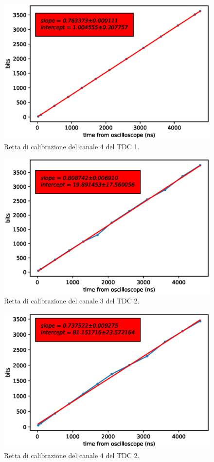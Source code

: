 \begin{figure}[H]
  \centering
  \includegraphics[width=.8\textwidth]{plots/tdc14.eps}
  \caption{Retta di calibrazione del canale 4 del TDC 1.}
  \label{fig:tdc14}
\end{figure}

\begin{figure}[H]
  \centering
  \includegraphics[width=.8\textwidth]{plots/tdc23.eps}
  \caption{Retta di calibrazione del canale 3 del TDC 2.}
  \label{fig:tdc23}
\end{figure}

\begin{figure}[H]
  \centering
  \includegraphics[width=.8\textwidth]{plots/tdc24.eps}
  \caption{Retta di calibrazione del canale 4 del TDC 2.}
  \label{fig:tdc24}
\end{figure}

